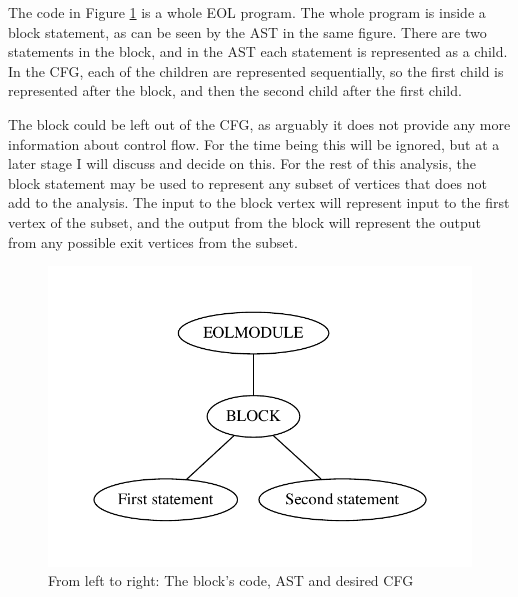 The code in Figure \ref{fig:block} is a whole EOL program. The whole program is inside a block statement, as can be seen by the AST in the same figure. There are two statements in the block, and in the AST each statement is represented as a child. In the CFG, each of the children are represented sequentially, so the first child is represented after the block, and then the second child after the first child.

The block could be left out of the CFG, as arguably it does not provide any more information about control flow. For the time being this will be ignored, but at a later stage I will discuss and decide on this. For the rest of this analysis, the block statement may be used to represent any subset of vertices that does not add to the analysis. The input to the block vertex will represent input to the first vertex of the subset, and the output from the block will represent the output from any possible exit vertices from the subset.

\begin{figure}
\centering
\begin{minipage}{.3\textwidth}
  \centering
  
\end{minipage}%
\begin{minipage}{.3\textwidth}
  \centering
  \includegraphics[width=\linewidth]{figures/statements/block_AST.pdf}
\end{minipage}
\begin{minipage}{.3\textwidth}
  \centering
\end{minipage}
\caption{From left to right: The block's code, AST and desired CFG}
\label{fig:block}
\end{figure}

